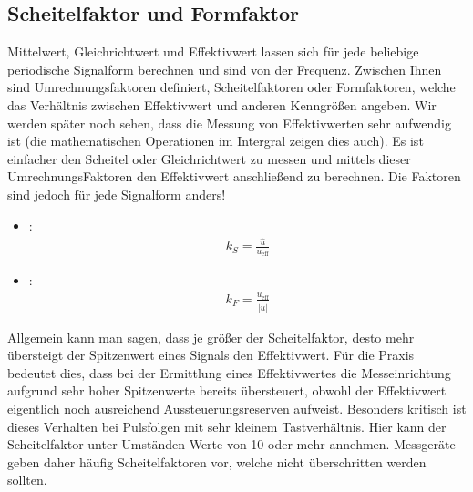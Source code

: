 \documentclass[letterpaper,10pt,english]{jupyterBook}
\begin{document}
\subsection{Scheitelfaktor und Formfaktor}
\label{\detokenize{content/3_Kenngroessen:scheitelfaktor-und-formfaktor}}
\sphinxAtStartPar
Mittelwert, Gleichrichtwert und Effektivwert lassen sich für jede beliebige periodische Signalform berechnen und sind  von der Frequenz. Zwischen Ihnen sind Umrechnungsfaktoren definiert, Scheitelfaktoren oder Formfaktoren, welche das Verhältnis zwischen Effektivwert und anderen Kenngrößen angeben. Wir werden später noch sehen, dass die Messung von Effektivwerten sehr aufwendig ist (die mathematischen Operationen im Intergral zeigen dies auch). Es ist einfacher den Scheitel\sphinxhyphen{} oder Gleichrichtwert zu messen und mittels dieser Umrechnungs\sphinxhyphen{}Faktoren den Effektivwert anschließend zu berechnen. Die Faktoren sind jedoch für jede Signalform anders!
\begin{itemize}
\item {} 
\sphinxAtStartPar
{}:
\begin{equation*}
\begin{split}k_S = \frac{\hat u}{u_\mathrm{eff}}\end{split}
\end{equation*}
\item {} 
\sphinxAtStartPar
{}:
\begin{equation*}
\begin{split}k_F = \frac{u_\mathrm{eff}}{\overline{|u|}}\end{split}
\end{equation*}
\end{itemize}

\sphinxAtStartPar
Allgemein kann man sagen, dass je größer der Scheitelfaktor, desto mehr übersteigt der Spitzenwert eines Signals den Effektivwert. Für die Praxis bedeutet dies, dass bei der Ermittlung eines Effektivwertes die Messeinrichtung aufgrund sehr hoher Spitzenwerte bereits übersteuert, obwohl der Effektivwert eigentlich noch ausreichend Aussteuerungsreserven aufweist. Besonders kritisch ist dieses Verhalten bei Pulsfolgen mit sehr kleinem Tastverhältnis. Hier kann der Scheitelfaktor unter Umständen Werte von 10 oder mehr annehmen. Messgeräte geben daher häufig Scheitelfaktoren vor, welche nicht überschritten werden sollten.
\end{document}
